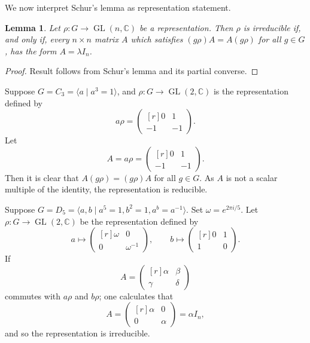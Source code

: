 \documentclass[11pt, notitlepage]{article}
\numberwithin{equation}{section}
\theoremstyle{plain}
\newtheorem{lemma}[theorem]{Lemma}
\theoremstyle{definition}
\newenvironment{example}
	{\pushQED{\qed}\renewcommand{\qedsymbol}{$\blacktriangleleft$}\examplex}
	{\popQED\endexamplex}
\newcommand{\C}{\mathbb{C}}
\DeclareMathOperator{\GL}{GL}
\begin{document}
We now interpret Schur's lemma as representation statement.

\begin{lemma}
Let $\rho : G \to \GL(n,\C)$ be a representation. Then $\rho$ is irreducible if, and only if, every $n \times n$ matrix $A$ which satisfies $(g\rho)A = A(g\rho)$ for all $g \in G$, has the form $A = \lambda I_n$.
\end{lemma}

\begin{proof}
Result follows from Schur's lemma and its partial converse.
\end{proof}

\begin{example}
Suppose $G = C_3 = \langle a \mid a^3 = 1\rangle$, and $\rho : G \to \GL(2,\C)$ is the representation defined by
\[
    a\rho = \begin{pmatrix*}[r]
        0 & 1\\ -1 & -1
    \end{pmatrix*}.
\]
Let
\[
    A = a\rho = \begin{pmatrix*}[r]
        0 & 1\\ -1 & -1
    \end{pmatrix*}.
\]
Then it is clear that $A(g\rho) = (g\rho)A$ for all $g \in G$. As $A$ is not a scalar multiple of the identity, the representation is reducible.
\end{example}

\begin{example}
Suppose $G = D_5 = \langle a,b \mid a^5 = 1, b^2=1, a^b=a^{-1}\rangle$. Set $\omega = e^{2\pi i/5}$. Let $\rho : G \to \GL(2,\C)$ be the representation defined by
\[
    a \mapsto \begin{pmatrix*}[r]
        \omega & 0\\ 0 & \omega^{-1}
    \end{pmatrix*}, \qquad b \mapsto \begin{pmatrix*}[r]
        0 & 1\\ 1 & 0
    \end{pmatrix*}.
\]
If
\[
    A = \begin{pmatrix*}[r]
        \alpha & \beta \\ \gamma & \delta
    \end{pmatrix*}
\]
commutes with $a \rho$ and $b \rho$; one calculates that
\[
    A = \begin{pmatrix*}[r]
        \alpha & 0 \\ 0 & \alpha
    \end{pmatrix*} = \alpha I_n,
\]
and so the representation is irreducible.
\end{example}
\end{document}

